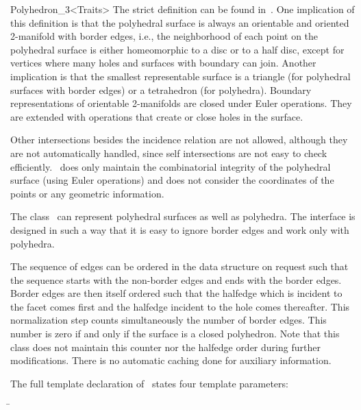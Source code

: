 \begin{ccRefClass}{Polyhedron_3<Traits>}
The strict definition can be found in~\cite{k-ugpdd-99}. One
implication of this definition is that the polyhedral surface is
always an orientable and oriented 2-manifold with border edges, i.e.,
the neighborhood of each point on the polyhedral surface is either
homeomorphic to a disc or to a half disc, except for vertices where
many holes and surfaces with boundary can join. Another implication is
that the smallest representable surface is a triangle (for polyhedral
surfaces with border edges) or a tetrahedron (for polyhedra). Boundary
representations of orientable 2-manifolds are closed under Euler
operations. They are extended with operations that create or close
holes in the surface.

Other intersections besides the incidence relation are not allowed,
although they are not automatically handled, since self intersections
are not easy to check efficiently. \ccClassTemplateName\ does only
maintain the combinatorial integrity of the polyhedral surface (using
Euler operations) and does not consider the coordinates of the points
or any geometric information.

The class \ccClassTemplateName\ can represent polyhedral surfaces as
well as polyhedra. The interface is designed in such a way that it
is easy to ignore border edges and work only with polyhedra.

The sequence of edges can be ordered in the data structure on request
such that the sequence starts with the non-border edges and ends with
the border edges. Border edges are then itself ordered such that the
halfedge which is incident to the facet comes first and the halfedge
incident to the hole comes thereafter. This normalization step counts
simultaneously the number of border edges. This number is zero if and
only if the surface is a closed polyhedron. Note that this class does
not maintain this counter nor the halfedge order during further
modifications. There is no automatic caching done for auxiliary
information.


\ccParameters

The full template declaration of \ccClassTemplateName\ states four
template parameters:

\begin{tabbing}
 \=\\
                 \>\\
                 \>
                 \\
                 \>\\
\end{tabbing}


\end{ccRefClass}
